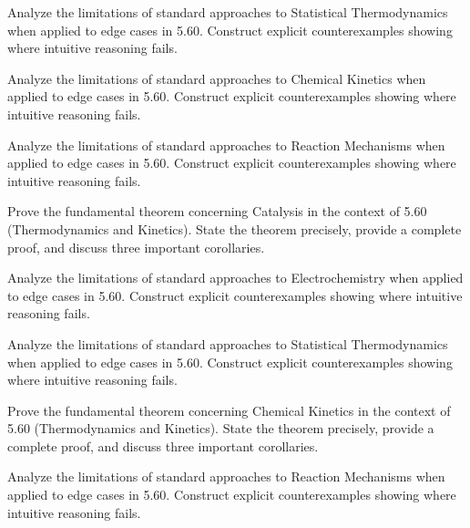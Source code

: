 \documentclass[12pt,a4paper]{exam}
\begin{document}
\begin{questions}

\question[4]
Analyze the limitations of standard approaches to Statistical Thermodynamics when applied to edge cases in 5.60. Construct explicit counterexamples showing where intuitive reasoning fails.

\vspace{0.3cm}

\question[3]
Analyze the limitations of standard approaches to Chemical Kinetics when applied to edge cases in 5.60. Construct explicit counterexamples showing where intuitive reasoning fails.

\vspace{0.3cm}

\question[7]
Analyze the limitations of standard approaches to Reaction Mechanisms when applied to edge cases in 5.60. Construct explicit counterexamples showing where intuitive reasoning fails.

\vspace{0.3cm}

\question[3]
Prove the fundamental theorem concerning Catalysis in the context of 5.60 (Thermodynamics and Kinetics). State the theorem precisely, provide a complete proof, and discuss three important corollaries.

\vspace{0.3cm}

\question[3]
Analyze the limitations of standard approaches to Electrochemistry when applied to edge cases in 5.60. Construct explicit counterexamples showing where intuitive reasoning fails.

\vspace{0.3cm}

\question[5]
Analyze the limitations of standard approaches to Statistical Thermodynamics when applied to edge cases in 5.60. Construct explicit counterexamples showing where intuitive reasoning fails.

\vspace{0.3cm}

\question[5]
Prove the fundamental theorem concerning Chemical Kinetics in the context of 5.60 (Thermodynamics and Kinetics). State the theorem precisely, provide a complete proof, and discuss three important corollaries.

\vspace{0.3cm}

\question[4]
Analyze the limitations of standard approaches to Reaction Mechanisms when applied to edge cases in 5.60. Construct explicit counterexamples showing where intuitive reasoning fails.


\end{questions}
\end{document}
